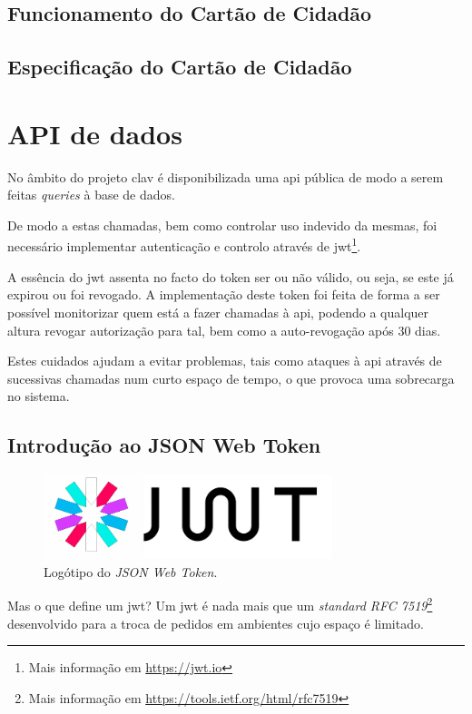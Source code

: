 \subsection{Funcionamento do Cartão de Cidadão}

\subsection{Especificação do Cartão de Cidadão}

\cleardoublepage
\section{API de dados}

No âmbito do projeto \gls{clav} é disponibilizada uma \gls{api} pública de modo a serem feitas \emph{queries} à base de dados.

De modo a estas chamadas, bem como controlar uso indevido da mesmas, foi necessário implementar autenticação e controlo através de \gls{jwt}\footnote{Mais informação em \url{https://jwt.io}}.

A essência do \gls{jwt} assenta no facto do token ser ou não válido, ou seja, se este já expirou ou foi revogado. A implementação deste token foi feita de forma a ser possível monitorizar quem está a fazer chamadas à \gls{api}, podendo a qualquer altura revogar autorização para tal, bem como a auto-revogação após 30 dias.

Estes cuidados ajudam a evitar problemas, tais como ataques à \gls{api} através de sucessivas chamadas num curto espaço de tempo, o que provoca uma sobrecarga no sistema.

\subsection{Introdução ao JSON Web Token}

\begin{figure}[h]
    \centering
    \includegraphics[width=0.75\textwidth]{img/jwt/jwtlogo.png}
    \caption{Logótipo do \emph{JSON Web Token}. \cite{jwtLogo}}
\end{figure}

Mas o que define um \gls{jwt}? Um \gls{jwt} é nada mais que um \emph{standard RFC 7519}\cite{jones2015json}\cite{peyrott2016jwt}\footnote{Mais informação em \url{https://tools.ietf.org/html/rfc7519}} desenvolvido para a troca de pedidos em ambientes cujo espaço é limitado. 

